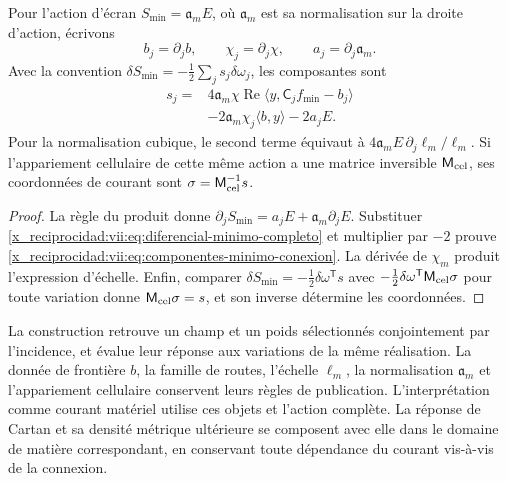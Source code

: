 \begin{theorem}
\label{x_reciprocidad:vii:thm:componentes-minimo-conexion}
Pour l'action d'écran
\(S_{\min}=\mathfrak a_m E\), où \(\mathfrak a_m\) est sa
normalisation sur la droite d'action, écrivons
\[
 b_j=\partial_jb,\qquad \chi_j=\partial_j\chi,
 \qquad a_j=\partial_j\mathfrak a_m.
\]
Avec la convention \(\delta S_{\min}=-\tfrac12\sum_j s_j\delta\omega_j\),
les composantes sont
\begin{equation}
 \begin{split}
 s_j={}&4\mathfrak a_m\chi\operatorname{Re}
             \langle y,\mathsf C_jf_{\min}-b_j\rangle\\
      &-2\mathfrak a_m\chi_j\langle b,y\rangle-2a_jE.
 \end{split}
 \label{x_reciprocidad:vii:eq:componentes-minimo-conexion}
\end{equation}
Pour la normalisation cubique, le second terme équivaut à
\(4\mathfrak a_m E\,\partial_j\ell_m/\ell_m\).
Si l'appariement cellulaire de cette même action a une matrice
inversible \(\mathsf M_{\rm cel}\), ses coordonnées de courant
sont \(\sigma=\mathsf M_{\rm cel}^{-1}s\).
\end{theorem}

\begin{proof}
La règle du produit donne
\(\partial_jS_{\min}=a_jE+\mathfrak a_m\partial_jE\).
Substituer \eqref{x_reciprocidad:vii:eq:diferencial-minimo-completo} et multiplier
par \(-2\) prouve \eqref{x_reciprocidad:vii:eq:componentes-minimo-conexion}.
La dérivée de \(\chi_m\) produit l'expression d'échelle.
Enfin, comparer
\(\delta S_{\min}=-\tfrac12\delta\omega^{\mathsf T}s\)
avec \(-\tfrac12\delta\omega^{\mathsf T}\mathsf M_{\rm cel}\sigma\)
pour toute variation donne \(\mathsf M_{\rm cel}\sigma=s\),
et son inverse détermine les coordonnées.
\end{proof}

La construction retrouve un champ et un poids sélectionnés conjointement
par l'incidence, et évalue leur réponse aux variations de la même
réalisation. La donnée de frontière \(b\), la famille de routes, l'échelle
\(\ell_m\), la normalisation \(\mathfrak a_m\) et l'appariement
cellulaire conservent leurs règles de publication. L'interprétation comme
courant matériel utilise ces objets et l'action complète. La
réponse de Cartan et sa densité métrique ultérieure se composent avec
elle dans le domaine de matière correspondant, en conservant toute
dépendance du courant vis-à-vis de la connexion.

